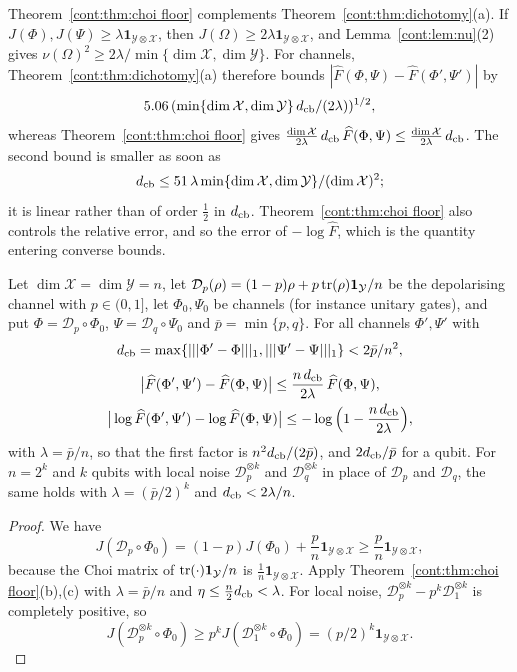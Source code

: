 \begin{remark}
Theorem~\ref{cont:thm:choi floor} complements Theorem~\ref{cont:thm:dichotomy}(a). If $J(\Phi),J(\Psi)\geq\lambda\mathbf{1}_{\mathcal{Y}\otimes\mathcal{X}}$, then $J(\Omega)\geq2\lambda\mathbf{1}_{\mathcal{Y}\otimes\mathcal{X}}$, and Lemma~\ref{cont:lem:nu}(2) gives $\nu(\Omega)^2\geq2\lambda/\min\{\dim\mathcal{X},\dim\mathcal{Y}\}$. For channels, Theorem~\ref{cont:thm:dichotomy}(a) therefore bounds $|\widehat F(\Phi,\Psi)-\widehat F(\Phi',\Psi')|$ by
\[%
5.06\,(\min\{\dim\mathcal{X},\dim\mathcal{Y}\}\,d_{\rm cb}/(2\lambda))^{1/2},
\]
whereas Theorem~\ref{cont:thm:choi floor} gives $\frac{\dim\mathcal{X}}{2\lambda}\,d_{\rm cb}\,\widehat{F}(\Phi,\Psi)\leq\frac{\dim\mathcal{X}}{2\lambda}\,d_{\rm cb}$. The second bound is smaller as soon as
\[
d_{\rm cb}\leq51\,\lambda\min\{\dim\mathcal{X},\dim\mathcal{Y}\}/(\dim\mathcal{X})^2;
\]
it is linear rather than of order $\frac12$ in $d_{\rm cb}$. Theorem~\ref{cont:thm:choi floor} also controls the relative error, and so the error of $-\log\widehat{F}$, which is the quantity entering converse bounds.
\end{remark}

\begin{corollary}\label{cont:cor:noisy gates}
Let $\dim\mathcal{X}=\dim\mathcal{Y}=n$, let $\mathcal{D}_p(\rho)=(1-p)\rho+p\operatorname{tr}(\rho)\mathbf{1}_{\mathcal{Y}}/n$ be the depolarising channel with $p\in(0,1]$, let $\Phi_0,\Psi_0$ be channels (for instance unitary gates), and put $\Phi=\mathcal{D}_p\circ\Phi_0$, $\Psi=\mathcal{D}_q\circ\Psi_0$ and $\bar p=\min\{p,q\}$. For all channels $\Phi',\Psi'$ with
\[
d_{\rm cb}=\max\{|||\Phi'-\Phi|||_1,|||\Psi'-\Psi|||_1\}<2\bar p/n^2,
\]
\begin{gather*}%
\big|\widehat{F}(\Phi',\Psi')-\widehat{F}(\Phi,\Psi)\big|\leq\frac{n\,d_{\rm cb}}{2\lambda}\,\widehat{F}(\Phi,\Psi),\\\big|\log\widehat{F}(\Phi',\Psi')-\log\widehat{F}(\Phi,\Psi)\big|\leq-\log\Big(1-\frac{n\,d_{\rm cb}}{2\lambda}\Big),
\end{gather*}
with $\lambda=\bar p/n$, so that the first factor is $n^2d_{\rm cb}/(2\bar p)$, and $2d_{\rm cb}/\bar p$ for a qubit. For $n=2^k$ and $k$ qubits with local noise $\mathcal{D}_p^{\otimes k}$ and $\mathcal{D}_q^{\otimes k}$ in place of $\mathcal{D}_p$ and $\mathcal{D}_q$, the same holds with $\lambda=(\bar p/2)^k$ and $d_{\rm cb}<2\lambda/n$.
\end{corollary}

\begin{proof}
We have
\[
J(\mathcal{D}_p\circ\Phi_0)=(1-p)J(\Phi_0)+\frac pn\mathbf{1}_{\mathcal{Y}\otimes\mathcal{X}}\geq\frac pn\mathbf{1}_{\mathcal{Y}\otimes\mathcal{X}},
\]
because the Choi matrix of $\operatorname{tr}(\cdot)\mathbf{1}_{\mathcal{Y}}/n$ is $\frac1n\mathbf{1}_{\mathcal{Y}\otimes\mathcal{X}}$. Apply Theorem~\ref{cont:thm:choi floor}(b),(c) with $\lambda=\bar p/n$ and $\eta\leq\frac n2d_{\rm cb}<\lambda$. For local noise, $\mathcal{D}_p^{\otimes k}-p^k\mathcal{D}_1^{\otimes k}$ is completely positive, so
\[
J(\mathcal{D}_p^{\otimes k}\circ\Phi_0)\geq p^kJ(\mathcal{D}_1^{\otimes k}\circ\Phi_0)=(p/2)^k\mathbf{1}_{\mathcal{Y}\otimes\mathcal{X}}.
\]
\end{proof}

